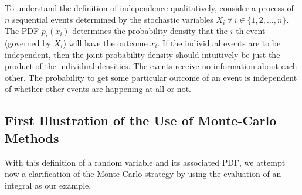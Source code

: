 To understand the definition of independence qualitatively, consider a
process of $n$ sequential events determined by the stochastic
variables $X_i\ \forall\ i\in\{1,2,\dots,n\}$. The PDF $p_i(x_i)$
determines the probability density that the $i$-th event (governed by
$X_i$) will have the outcome $x_i$. If the individual events are to be
independent, then the joint probability density should intuitively be
just the product of the individual densities. The events receive no
information about each other. The probability to get some particular
outcome of an event is independent of whether other events are
happening at all or not.







\subsection{First Illustration of the Use of Monte-Carlo Methods}

With this definition of a random variable and its associated PDF, 
we attempt now
a clarification of the Monte-Carlo strategy by using the 
evaluation of an integral
as our example. 

